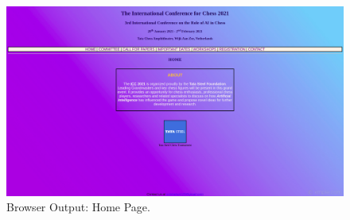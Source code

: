 \documentclass[12pt, a4]{article}
\begin{document}
\newpage
\subsection*{}
\begin{flushleft}

\end{flushleft}

\newpage
\subsection*{}
\begin{flushleft}

\end{flushleft}

\newpage
\subsection*{}
\begin{flushleft}

\end{flushleft}

\newpage
\subsection*{}
\begin{flushleft}

\end{flushleft}

\newpage
\subsection*{}
\begin{flushleft}

\end{flushleft}

\newpage
\subsection*{}
\begin{figure}[h]
\centering
\caption{Browser Output: Home Page.}
\includegraphics[scale = 0.25]{Output/Home.png}
\end{figure}
\end{document}
